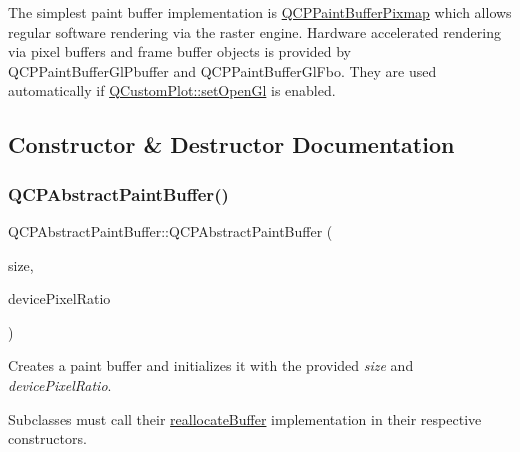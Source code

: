 The simplest paint buffer implementation is \mbox{\hyperlink{class_q_c_p_paint_buffer_pixmap}{Q\+C\+P\+Paint\+Buffer\+Pixmap}} which allows regular software rendering via the raster engine. Hardware accelerated rendering via pixel buffers and frame buffer objects is provided by Q\+C\+P\+Paint\+Buffer\+Gl\+Pbuffer and Q\+C\+P\+Paint\+Buffer\+Gl\+Fbo. They are used automatically if \mbox{\hyperlink{class_q_custom_plot_a7db1adc09016329f3aef7c60da935789}{Q\+Custom\+Plot\+::set\+Open\+Gl}} is enabled. 

\subsection{Constructor \& Destructor Documentation}
\mbox{\label{class_q_c_p_abstract_paint_buffer_a3ce532c12f10b81697108835755641e2}} 
\subsubsection{\texorpdfstring{QCPAbstractPaintBuffer()}{QCPAbstractPaintBuffer()}}
{\footnotesize\ttfamily Q\+C\+P\+Abstract\+Paint\+Buffer\+::\+Q\+C\+P\+Abstract\+Paint\+Buffer (\begin{DoxyParamCaption}\item[{const Q\+Size \&}]{size,  }\item[{double}]{device\+Pixel\+Ratio }\end{DoxyParamCaption})\hspace{0.3cm}{\ttfamily [explicit]}}

Creates a paint buffer and initializes it with the provided {\itshape size} and {\itshape device\+Pixel\+Ratio}.

Subclasses must call their \mbox{\hyperlink{class_q_c_p_abstract_paint_buffer_aee7506a52bd7e5a07c2af27935eb13e7}{reallocate\+Buffer}} implementation in their respective constructors. \mbox{\label{class_q_c_p_abstract_paint_buffer_a50fbb1265814d019a1707f4cb11e20de}} 
